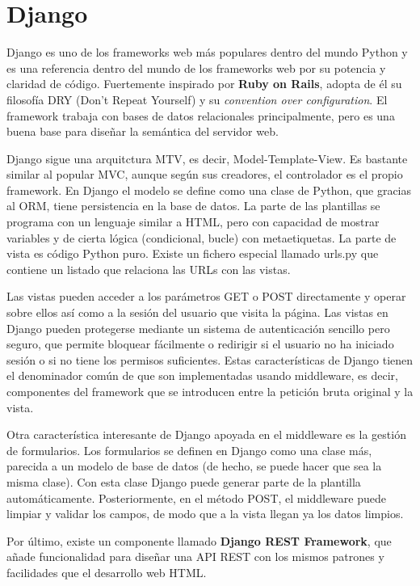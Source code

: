 \documentclass[12pt]{report} %
\begin{document}
\section{Django}
Django es uno de los frameworks web más populares dentro del mundo Python y es una referencia dentro del mundo de los frameworks web por su potencia y claridad de código.\cite{django}
Fuertemente inspirado por \textbf{Ruby on Rails}, adopta de él su filosofía DRY (Don't Repeat Yourself) y su \textit{convention over configuration}.
El framework trabaja con bases de datos relacionales principalmente, pero es una buena base para diseñar la semántica del servidor web.

Django sigue una arquitctura MTV, es decir, Model-Template-View. Es bastante similar al popular MVC, aunque según sus creadores, el controlador es el propio framework.
En Django el modelo se define como una clase de Python, que gracias al ORM, tiene persistencia en la base de datos. La parte de las plantillas se programa con un lenguaje similar a HTML, pero con capacidad de mostrar variables
y de cierta lógica (condicional, bucle) con metaetiquetas. La parte de vista es código Python puro. Existe un fichero especial llamado urls.py que contiene un listado que relaciona las URLs con las vistas.

Las vistas pueden acceder a los parámetros GET o POST directamente y operar sobre ellos así como a la sesión del usuario que visita la página.
Las vistas en Django pueden protegerse mediante un sistema de autenticación sencillo pero seguro, que permite bloquear fácilmente o redirigir si el usuario no ha iniciado sesión o si no tiene los permisos suficientes.
Estas características de Django tienen el denominador común de que son implementadas usando middleware, es decir, componentes del framework que se introducen entre la petición bruta original
y la vista.

Otra característica interesante de Django apoyada en el middleware es la gestión de formularios. Los formularios se definen en Django como una clase más, parecida a un modelo de base de datos (de hecho, se puede hacer que sea la misma clase).
Con esta clase Django puede generar parte de la plantilla automáticamente. Posteriormente, en el método POST, el middleware puede limpiar y validar los campos, de modo que a la vista llegan ya los datos limpios.

Por último, existe un componente llamado \textbf{Django REST Framework}, que añade funcionalidad para diseñar una API REST con los mismos patrones y facilidades que el desarrollo web HTML.
\end{document}

